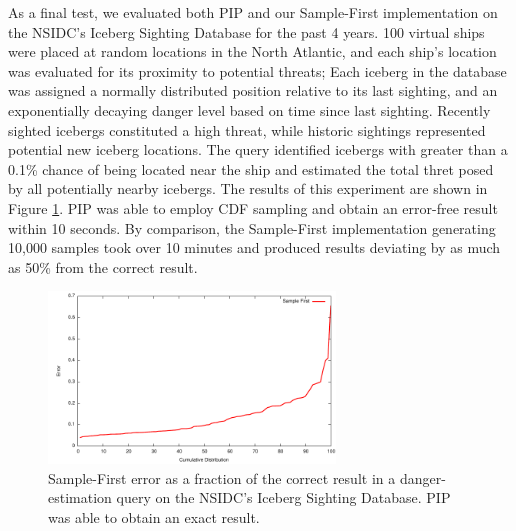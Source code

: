 As a final test, we evaluated both PIP and our Sample-First implementation on the NSIDC's Iceberg Sighting Database\cite{iceberg} for the past 4 years.  100 virtual ships were placed at random locations in the North Atlantic, and each ship's location was evaluated for its proximity to potential threats; Each iceberg in the database was assigned a normally distributed position relative to its last sighting, and an exponentially decaying danger level based on time since last sighting.  Recently sighted icebergs constituted a high threat, while historic sightings represented potential new iceberg locations.  The query identified icebergs with greater than a 0.1\% chance of being located near the ship and estimated the total thret posed by all potentially nearby icebergs.  The results of this experiment are shown in Figure \ref{fig:iceberg}.  PIP was able to employ CDF sampling and obtain an error-free result within 10 seconds.  By comparison, the Sample-First implementation generating 10,000 samples took over 10 minutes and produced results deviating by as much as 50\% from the correct result.

\begin{figure}
\begin{center}
\includegraphics[width=3in]{graphics/iceberg_danger.pdf}
\caption{Sample-First error as a fraction of the correct result in a danger-estimation query on the NSIDC's Iceberg Sighting Database.  PIP was able to obtain an exact result.}
\end{center}
\label{fig:iceberg}
\vspace*{-0.3in}
\end{figure}


